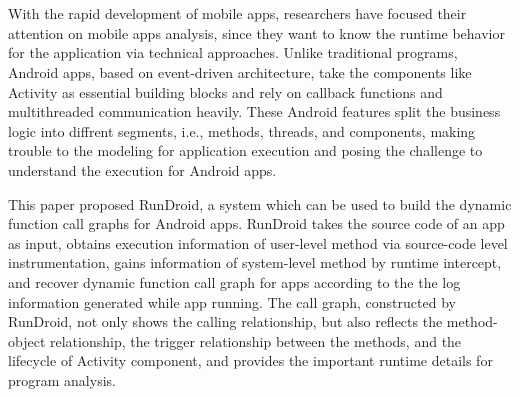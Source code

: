 \newpage

\vspace{-500pt}

\chapter*{}




With the rapid development of mobile apps, researchers have focused their attention on  mobile apps analysis,
since they want to know the runtime behavior for the application via technical approaches.
Unlike traditional programs, Android apps, based on  event-driven architecture,  take the components like Activity as  essential building blocks and  rely on callback functions and multithreaded communication heavily.
These Android features split the business logic into diffrent segments, i.e., methods, threads, and components,  making trouble to the modeling for application execution and  posing the challenge to understand the execution for Android apps.





This paper proposed  RunDroid, a system which can be used to build the dynamic function call graphs for Android apps.
RunDroid takes the source code of an app as input, obtains  execution information of user-level method via  source-code level instrumentation,
gains  information of system-level method by runtime intercept, 
and  recover dynamic function call graph for apps according to the the log information generated while app running.
The call graph, constructed by RunDroid, not only shows the calling relationship, but also reflects the method-object relationship, the trigger relationship between the methods, and the lifecycle of  Activity component, 
and provides the important runtime details for program analysis.



